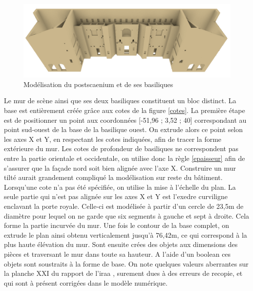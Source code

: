 \begin{figure}[!h]
	\includegraphics[width=\linewidth]{images/modMur2}
	\caption{Modélisation du \gls{postscaenium} et de ses \glspl{basilique}} 
	\label{modCavea} 
\end{figure} 

Le mur de scène ainsi que ses deux basiliques constituent un bloc distinct. La base est entièrement créée grâce aux cotes de la figure \ref{cotes}. La première étape est de positionner un point aux coordonnées [-51,96 ; 3,52 ; 40] correspondant au point sud-ouest de la base de la basilique ouest. On extrude alors ce point selon les axes X et Y, en respectant les cotes indiquées, afin de tracer la forme extérieure du mur. Les cotes de profondeur de basiliques ne correspondent pas entre la partie orientale et occidentale, on utilise donc la règle \ref{epaisseur} afin de s'assurer que la façade nord soit bien alignée avec l'axe X. Construire un mur tilté aurait grandement compliqué la modélisation sur reste du bâtiment. Lorsqu'une cote n'a pas été spécifiée, on utilise la mise à l'échelle du plan. La seule partie qui n'est pas alignée sur les axes X et Y est l'\gls{exedre} curviligne enclavant la porte royale. Celle-ci est modélisée à partir d'un cercle de 23,5m de diamètre pour lequel on ne garde que six segments à gauche et sept à droite. Cela forme la partie incurvée du mur. Une fois le contour de la base complet, on extrude le plan ainsi obtenu verticalement jusqu'à 76,42m, ce qui correspond à la plus haute élévation du mur.
Sont ensuite crées des objets aux dimensions des pièces et traversant le mur dans toute sa hauteur. A l'aide d'un \gls{boolean} ces objets sont soustraits à la forme de base. On note quelques valeurs aberrantes sur la planche XXI du rapport de l'{iraa} \cite[Pl. XXI]{orangePl}, surement dues à des erreurs de recopie, et qui sont à présent corrigées dans le modèle numérique. 

